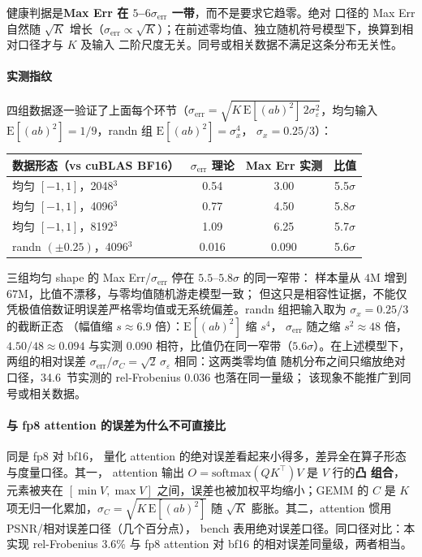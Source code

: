 健康判据是\textbf{Max Err 在 $5$--$6\sigma_{\text{err}}$ 一带}，而不是要求它趋零。绝对
口径的 Max Err 自然随 $\sqrt{K}$ 增长（$\sigma_{\text{err}} \propto
\sqrt{K}$）；在前述零均值、独立随机符号模型下，换算到相对口径才与 $K$ 及输入
二阶尺度无关。同号或相关数据不满足这条分布无关性。

\paragraph{实测指纹} 四组数据逐一验证了上面每个环节（$\sigma_{\text{err}}
= \sqrt{K\,\mathrm{E}[(ab)^2]\,2\sigma_\varepsilon^2}$，均匀输入
$\mathrm{E}[(ab)^2] = 1/9$，randn 组 $\mathrm{E}[(ab)^2] = \sigma_x^4$，
$\sigma_x = 0.25/3$）：

\begin{center}
\footnotesize
\begin{tabular}{lccc}
\toprule
数据形态（vs cuBLAS BF16） & $\sigma_{\text{err}}$ 理论 & Max Err 实测 & 比值 \\
\midrule
均匀 $[-1,1]$，2048$^3$ & 0.54 & 3.00 & 5.5$\sigma$ \\
均匀 $[-1,1]$，4096$^3$ & 0.77 & 4.50 & 5.8$\sigma$ \\
均匀 $[-1,1]$，8192$^3$ & 1.09 & 6.25 & 5.7$\sigma$ \\
randn $(\pm 0.25)$，4096$^3$ & 0.016 & 0.090 & 5.6$\sigma$ \\
\bottomrule
\end{tabular}
\end{center}

三组均匀 shape 的 Max Err/$\sigma_{\text{err}}$ 停在 $5.5$--$5.8\sigma$ 的同一窄带：
样本量从 $4\text{M}$ 增到 $67\text{M}$，比值不漂移，与零均值随机游走模型一致；
但这只是相容性证据，不能仅凭极值倍数证明误差严格零均值或无系统偏差。randn 组把输入取为 $\sigma_x = 0.25/3$ 的截断正态
（幅值缩 $s \approx 6.9$ 倍）：$\mathrm{E}[(ab)^2]$ 缩 $s^4$，
$\sigma_{\text{err}}$ 随之缩 $s^2 \approx 48$ 倍，$4.50/48 \approx 0.094$
与实测 0.090 相符，比值仍在同一窄带（$5.6\sigma$）。在上述模型下，两组的相对误差
$\sigma_{\text{err}}/\sigma_C = \sqrt{2}\,\sigma_\varepsilon$ 相同：这两类零均值
随机分布之间只缩放绝对口径，34.6~节实测的 rel-Frobenius 0.036 也落在同一量级；
该现象不能推广到同号或相关数据。

\paragraph{与 fp8 attention 的误差为什么不可直接比} 同是 fp8 对 bf16，
量化 attention 的绝对误差看起来小得多，差异全在算子形态与度量口径。其一，
attention 输出 $O = \mathrm{softmax}(QK^{\top})V$ 是 $V$ 行的\textbf{凸
组合}，元素被夹在 $[\min V, \max V]$ 之间，误差也被加权平均缩小；GEMM 的
$C$ 是 $K$ 项无归一化累加，$\sigma_C = \sqrt{K\,\mathrm{E}[(ab)^2]}$
随 $\sqrt{K}$ 膨胀。其二，attention 惯用 PSNR/相对误差口径（几个百分点），
bench 表用绝对误差口径。同口径对比：本实现 rel-Frobenius 3.6\% 与 fp8
attention 对 bf16 的相对误差同量级，两者相当。

